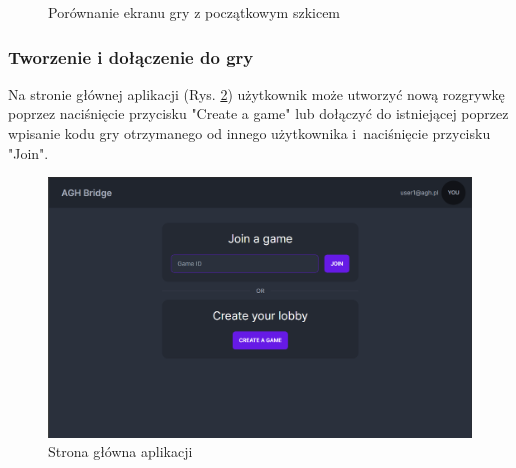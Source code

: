 \begin{figure}[h!]
    \centering
    \hspace*{0.5cm}
    \caption{Porównanie ekranu gry z początkowym szkicem}
    \label{fig:compare_game}
  \end{figure}
  
\FloatBarrier
 
\subsubsection{Tworzenie i dołączenie do gry}

Na stronie głównej aplikacji (Rys. \ref{fig:home}) użytkownik może utworzyć nową 
rozgrywkę poprzez naciśnięcie przycisku "Create a game" lub dołączyć do istniejącej 
poprzez wpisanie kodu gry otrzymanego od innego użytkownika i~naciśnięcie 
przycisku "Join".

\begin{figure}[h!]
  \centering
  \includegraphics[width=\textwidth]{img/widoki/home.png}
  \caption{Strona główna aplikacji}
  \label{fig:home}
\end{figure}

